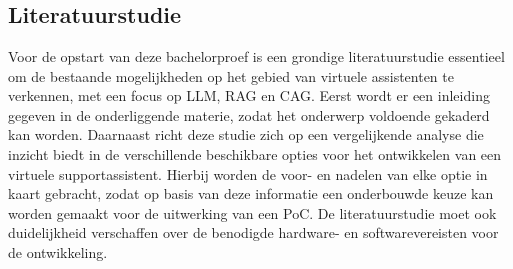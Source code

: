 
\chapter{}
\label{ch:methodologie}



\section{Literatuurstudie}

Voor de opstart van deze bachelorproef is een grondige literatuurstudie essentieel om de bestaande mogelijkheden op het gebied van virtuele assistenten te verkennen, met een focus op LLM, RAG en CAG. Eerst wordt er een inleiding gegeven in de onderliggende materie, zodat het onderwerp voldoende gekaderd kan worden. Daarnaast richt deze studie zich op een vergelijkende analyse die inzicht biedt in de verschillende beschikbare opties voor het ontwikkelen van een virtuele supportassistent. Hierbij worden de voor- en nadelen van elke optie in kaart gebracht, zodat op basis van deze informatie een onderbouwde keuze kan worden gemaakt voor de uitwerking van een PoC. De literatuurstudie moet ook duidelijkheid verschaffen over de benodigde hardware- en softwarevereisten voor de ontwikkeling.

